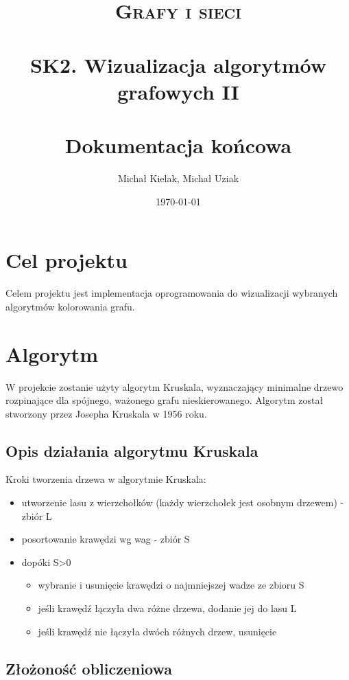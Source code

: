 \documentclass[paper=a4, fontsize=11pt]{scrartcl} %
\title{	
\normalfont \normalsize 
\textsc{Grafy i sieci} \\ [25pt] %
\horrule{0.5pt} \\[0.4cm] %
\huge SK2. Wizualizacja algorytmów grafowych II \\ %
\horrule{2pt} \\[0.5cm] %
\LARGE Dokumentacja końcowa
}%
\author{Michał Kielak, Michał Uziak} %
\date{\normalsize\today} %
\numberwithin{equation}{section} %
\numberwithin{figure}{section} %
\numberwithin{table}{section} %
\begin{document}
\maketitle %


\section{Cel projektu}

Celem projektu jest implementacja oprogramowania do wizualizacji wybranych algorytmów kolorowania grafu.

\section{Algorytm}

W projekcie zostanie użyty algorytm Kruskala, wyznaczający minimalne drzewo rozpinające dla spójnego, ważonego grafu nieskierowanego. Algorytm został stworzony przez Josepha Kruskala w 1956 roku.
 

\subsection{Opis działania algorytmu Kruskala}

Kroki tworzenia drzewa w algorytmie Kruskala:
\begin{itemize}
	\item utworzenie lasu z wierzchołków (każdy wierzchołek jest osobnym drzewem) - zbiór L
	\item posortowanie krawędzi wg wag - zbiór S
	\item dopóki S>0
		\begin{itemize}
			\item wybranie i usunięcie krawędzi o najmniejszej wadze ze zbioru S
			\item jeśli krawędź łączyła dwa różne drzewa, dodanie jej do lasu L
			\item jeśli krawędź nie łączyła dwóch różnych drzew, usunięcie
		\end{itemize}
\end{itemize} 

\subsection{Złożoność obliczeniowa}
\end{document}
